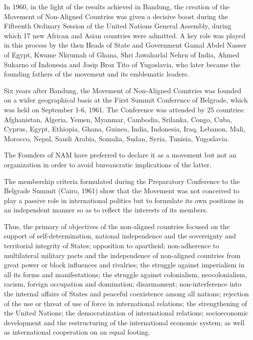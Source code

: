 \documentclass[
  openany]{book}
\begin{document}
In 1960, in the light of the results achieved in Bandung, the creation of the Movement of Non-Aligned Countries was given a decisive boost during the Fifteenth Ordinary Session of the United Nations General Assembly, during which 17 new African and Asian countries were admitted. A key role was played in this process by the then Heads of State and Government Gamal Abdel Nasser of Egypt, Kwame Nkrumah of Ghana, Shri Jawaharlal Nehru of India, Ahmed Sukarno of Indonesia and Josip Broz Tito of Yugoslavia, who later became the founding fathers of the movement and its emblematic leaders.

Six years after Bandung, the Movement of Non-Aligned Countries was founded on a wider geographical basis at the First Summit Conference of Belgrade, which was held on September 1-6, 1961. The Conference was attended by 25 countries: Afghanistan, Algeria, Yemen, Myanmar, Cambodia, Srilanka, Congo, Cuba, Cyprus, Egypt, Ethiopia, Ghana, Guinea, India, Indonesia, Iraq, Lebanon, Mali, Morocco, Nepal, Saudi Arabia, Somalia, Sudan, Syria, Tunisia, Yugoslavia.

The Founders of NAM have preferred to declare it as a movement but not an organization in order to avoid bureaucratic implications of the latter.

The membership criteria formulated during the Preparatory Conference to the Belgrade Summit (Cairo, 1961) show that the Movement was not conceived to play a passive role in international politics but to formulate its own positions in an independent manner so as to reflect the interests of its members.

Thus, the primary of objectives of the non-aligned countries focused on the support of self-determination, national independence and the sovereignty and territorial integrity of States; opposition to apartheid; non-adherence to multilateral military pacts and the independence of non-aligned countries from great power or block influences and rivalries; the struggle against imperialism in all its forms and manifestations; the struggle against colonialism, neocolonialism, racism, foreign occupation and domination; disarmament; non-interference into the internal affairs of States and peaceful coexistence among all nations; rejection of the use or threat of use of force in international relations; the strengthening of the United Nations; the democratization of international relations; socioeconomic development and the restructuring of the international economic system; as well as international cooperation on an equal footing.
\end{document}
